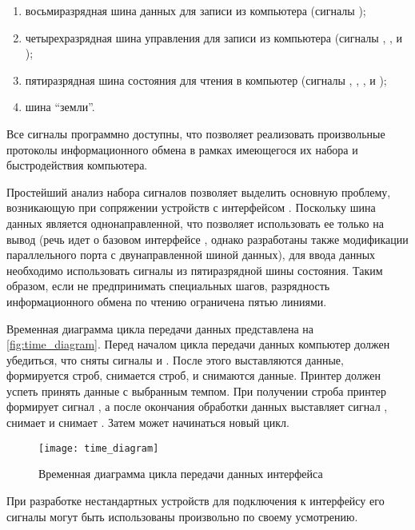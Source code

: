 \begin{enumerate}
    \item восьмиразрядная шина данных для записи из компьютера (сигналы );
    \item четырехразрядная шина управления для записи из компьютера (сигналы , ,  и );
    \item пятиразрядная шина состояния для чтения в компьютер (сигналы , , ,  и );
    \item шина \enquote{земли}.
\end{enumerate}

Все сигналы программно доступны, что позволяет реализовать произвольные протоколы информационного обмена в рамках имеющегося их набора и быстродействия компьютера.

Простейший анализ набора сигналов позволяет выделить основную проблему, возникающую при сопряжении устройств с интерфейсом . Поскольку шина данных является однонаправленной, что позволяет использовать ее только на вывод (речь идет о базовом интерфейсе , однако разработаны также модификации параллельного порта с двунаправленной шиной данных), для ввода данных необходимо использовать сигналы из пятиразрядной шины состояния. Таким образом, если не предпринимать специальных шагов, разрядность информационного обмена по чтению ограничена пятью линиями.

Временная диаграмма цикла передачи данных представлена на \autoref{fig:time_diagram}. Перед началом цикла передачи данных компьютер должен убедиться, что сняты сигналы  и . После этого выставляются данные, формируется строб, снимается строб, и снимаются данные. Принтер должен успеть принять данные с выбранным темпом. При получении строба принтер формирует сигнал , а после окончания обработки данных выставляет сигнал , снимает  и снимает . Затем может начинаться новый цикл.
%
\begin{figure}[h]%
    \centering
    \texttt{[image: time\_diagram]}%
    \caption[]{Временная диаграмма цикла передачи данных интерфейса }%
    \label{fig:time_diagram}%
\end{figure}

При разработке нестандартных устройств для подключения к интерфейсу  его сигналы могут быть использованы произвольно по своему усмотрению.

